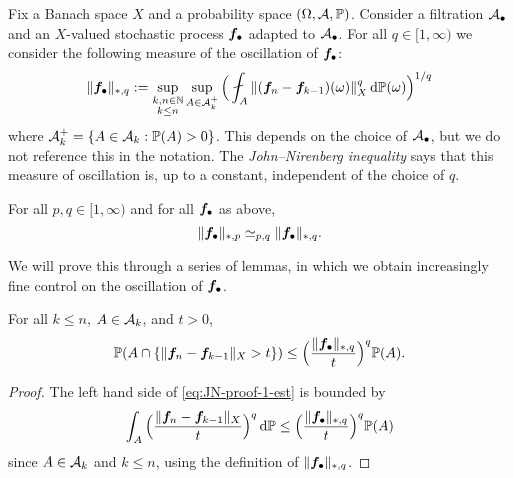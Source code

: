 Fix a Banach space $X$ and a probability space $(\Omega,\mathcal{A},\mathbb{P})$.
Consider a filtration $\mathcal{A}_{\bullet}$ and an $X$-valued stochastic process $\bm{f}_{\bullet}$ adapted to $\mathcal{A}_{\bullet}$.
For all $q \in [1,\infty)$ we consider the following measure of the oscillation of $\bm{f}_{\bullet}$:
\begin{equation*}
  \|\mb{f}_{\bullet}\|_{*,q} := \sup_{\substack{k,n \in \N \\ k \leq n}} \sup_{A \in \mc{A}_k^{+}} \Big( \fint_{A} \|(\mb{f}_n - \mb{f}_{k-1})(\omega)\|_{X}^{q} \, \dd\P(\omega)\Big)^{1/q}
\end{equation*}
where $\mathcal{A}_{k}^{+} = \{A \in \mathcal{A}_{k} : \mathbb{P}(A) > 0\}$.
This depends on the choice of $\mathcal{A}_{\bullet}$, but we do not reference this in the notation.
The \emph{John--Nirenberg inequality} says that this measure of oscillation is, up to a constant, independent of the choice of $q$.

\begin{thm}\label{thm:jn-adapted-sequences}
  For all $p,q \in [1,\infty)$ and for all $\bm{f}_{\bullet}$ as above,
  \begin{equation*}
    \|\bm{f}_{\bullet}\|_{*,p} \simeq_{p,q} \|\bm{f}_{\bullet}\|_{*,q}.
  \end{equation*}
\end{thm}

We will prove this through a series of lemmas, in which we obtain increasingly fine control on the oscillation of $\bm{f}_{\bullet}$.

\begin{lem}\label{lem:JN-proof-1}
  For all $k \leq n$, $A \in \mathcal{A}_k$, and $t > 0$,
  \begin{equation}\label{eq:JN-proof-1-est}
    \mathbb{P}(A \cap \{ \|\bm{f}_n - \bm{f}_{k-1}\|_{X} > t \}) \leq \Big( \frac{\|\bm{f}_{\bullet}\|_{*,q}}{t} \Big)^{q} \mathbb{P}(A).
  \end{equation}
\end{lem}

\begin{proof}
  The left hand side of \eqref{eq:JN-proof-1-est} is bounded by
  \begin{equation*}
    \int_{A} \Big( \frac{\|\bm{f}_n - \bm{f}_{k-1}\|_{X}}{t} \Big)^{q} \, \mathrm{d}\mathbb{P} \leq \Big( \frac{\|\bm{f}_{\bullet}\|_{*,q}}{t} \Big)^{q} \mathbb{P}(A) 
  \end{equation*}
  since $A \in \mathcal{A}_k$ and $k \leq n$, using the definition of $\|\bm{f}_{\bullet}\|_{*,q}$.
\end{proof}

